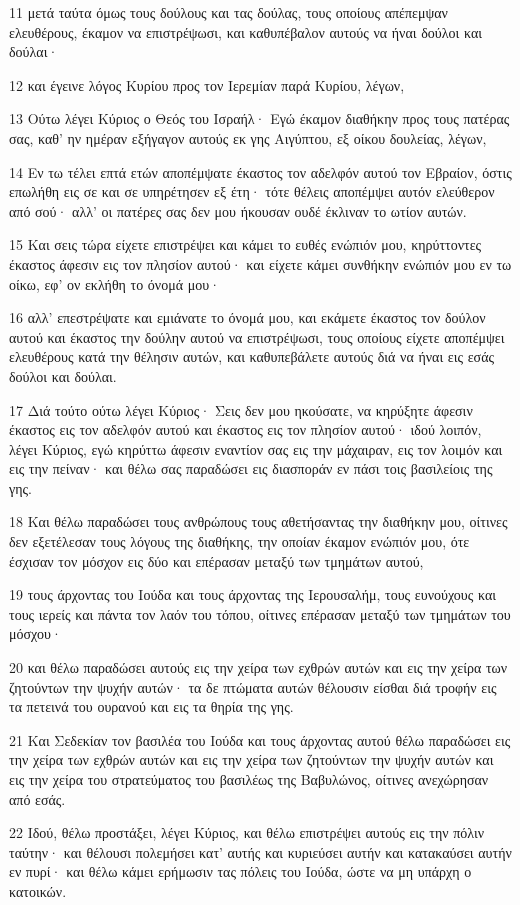 \par 11 μετά ταύτα όμως τους δούλους και τας δούλας, τους οποίους απέπεμψαν ελευθέρους, έκαμον να επιστρέψωσι, και καθυπέβαλον αυτούς να ήναι δούλοι και δούλαι·
\par 12 και έγεινε λόγος Κυρίου προς τον Ιερεμίαν παρά Κυρίου, λέγων,
\par 13 Ούτω λέγει Κύριος ο Θεός του Ισραήλ· Εγώ έκαμον διαθήκην προς τους πατέρας σας, καθ' ην ημέραν εξήγαγον αυτούς εκ γης Αιγύπτου, εξ οίκου δουλείας, λέγων,
\par 14 Εν τω τέλει επτά ετών αποπέμψατε έκαστος τον αδελφόν αυτού τον Εβραίον, όστις επωλήθη εις σε και σε υπηρέτησεν εξ έτη· τότε θέλεις αποπέμψει αυτόν ελεύθερον από σού· αλλ' οι πατέρες σας δεν μου ήκουσαν ουδέ έκλιναν το ωτίον αυτών.
\par 15 Και σεις τώρα είχετε επιστρέψει και κάμει το ευθές ενώπιόν μου, κηρύττοντες έκαστος άφεσιν εις τον πλησίον αυτού· και είχετε κάμει συνθήκην ενώπιόν μου εν τω οίκω, εφ' ον εκλήθη το όνομά μου·
\par 16 αλλ' επεστρέψατε και εμιάνατε το όνομά μου, και εκάμετε έκαστος τον δούλον αυτού και έκαστος την δούλην αυτού να επιστρέψωσι, τους οποίους είχετε αποπέμψει ελευθέρους κατά την θέλησιν αυτών, και καθυπεβάλετε αυτούς διά να ήναι εις εσάς δούλοι και δούλαι.
\par 17 Διά τούτο ούτω λέγει Κύριος· Σεις δεν μου ηκούσατε, να κηρύξητε άφεσιν έκαστος εις τον αδελφόν αυτού και έκαστος εις τον πλησίον αυτού· ιδού λοιπόν, λέγει Κύριος, εγώ κηρύττω άφεσιν εναντίον σας εις την μάχαιραν, εις τον λοιμόν και εις την πείναν· και θέλω σας παραδώσει εις διασποράν εν πάσι τοις βασιλείοις της γης.
\par 18 Και θέλω παραδώσει τους ανθρώπους τους αθετήσαντας την διαθήκην μου, οίτινες δεν εξετέλεσαν τους λόγους της διαθήκης, την οποίαν έκαμον ενώπιόν μου, ότε έσχισαν τον μόσχον εις δύο και επέρασαν μεταξύ των τμημάτων αυτού,
\par 19 τους άρχοντας του Ιούδα και τους άρχοντας της Ιερουσαλήμ, τους ευνούχους και τους ιερείς και πάντα τον λαόν του τόπου, οίτινες επέρασαν μεταξύ των τμημάτων του μόσχου·
\par 20 και θέλω παραδώσει αυτούς εις την χείρα των εχθρών αυτών και εις την χείρα των ζητούντων την ψυχήν αυτών· τα δε πτώματα αυτών θέλουσιν είσθαι διά τροφήν εις τα πετεινά του ουρανού και εις τα θηρία της γης.
\par 21 Και Σεδεκίαν τον βασιλέα του Ιούδα και τους άρχοντας αυτού θέλω παραδώσει εις την χείρα των εχθρών αυτών και εις την χείρα των ζητούντων την ψυχήν αυτών και εις την χείρα του στρατεύματος του βασιλέως της Βαβυλώνος, οίτινες ανεχώρησαν από εσάς.
\par 22 Ιδού, θέλω προστάξει, λέγει Κύριος, και θέλω επιστρέψει αυτούς εις την πόλιν ταύτην· και θέλουσι πολεμήσει κατ' αυτής και κυριεύσει αυτήν και κατακαύσει αυτήν εν πυρί· και θέλω κάμει ερήμωσιν τας πόλεις του Ιούδα, ώστε να μη υπάρχη ο κατοικών.

